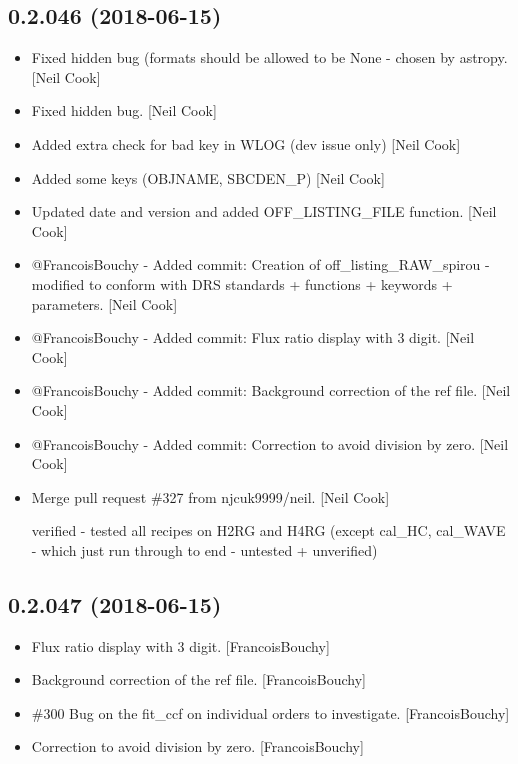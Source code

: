 \documentclass[a4paper,10pt,english]{report}
\begin{document}
\subsection{0.2.046 (2018-06-15)}
\label{\detokenize{misc/changelog:id417}}\begin{itemize}
\item {} 
Fixed hidden bug (formats should be allowed to be None - chosen by
astropy. {[}Neil Cook{]}

\item {} 
Fixed hidden bug. {[}Neil Cook{]}

\item {} 
Added extra check for bad key in WLOG (dev issue only) {[}Neil Cook{]}

\item {} 
Added some keys (OBJNAME, SBCDEN\_P) {[}Neil Cook{]}

\item {} 
Updated date and version and added OFF\_LISTING\_FILE function. {[}Neil
Cook{]}

\item {} 
@FrancoisBouchy - Added commit: Creation of off\_listing\_RAW\_spirou -
modified to conform with DRS standards + functions + keywords +
parameters. {[}Neil Cook{]}

\item {} 
@FrancoisBouchy - Added commit: Flux ratio display with 3 digit. {[}Neil
Cook{]}

\item {} 
@FrancoisBouchy - Added commit: Background correction of the ref file.
{[}Neil Cook{]}

\item {} 
@FrancoisBouchy - Added commit: Correction to avoid division by zero.
{[}Neil Cook{]}

\item {} 
Merge pull request \#327 from njcuk9999/neil. {[}Neil Cook{]}

verified - tested all recipes on H2RG and H4RG (except cal\_HC, cal\_WAVE - which just run through to end - untested + unverified)

\end{itemize}


\subsection{0.2.047 (2018-06-15)}
\label{\detokenize{misc/changelog:id418}}\begin{itemize}
\item {} 
Flux ratio display with 3 digit. {[}FrancoisBouchy{]}

\item {} 
Background correction of the ref file. {[}FrancoisBouchy{]}

\item {} 
\#300 Bug on the fit\_ccf on individual orders to investigate.
{[}FrancoisBouchy{]}

\item {} 
Correction to avoid division by zero. {[}FrancoisBouchy{]}

\end{itemize}
\end{document}
